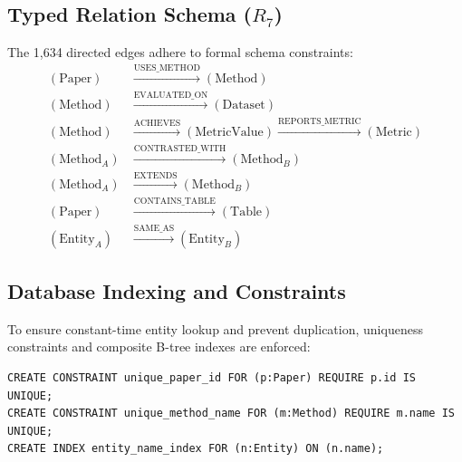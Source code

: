 \documentclass[12pt,a4paper,oneside]{report}
\begin{document}
\subsection{Typed Relation Schema ($R_7$)}
The 1,634 directed edges adhere to formal schema constraints:
\begin{equation}
\begin{aligned}
    (\text{Paper}) &\xrightarrow{\text{USES\_METHOD}} (\text{Method}) \\
    (\text{Method}) &\xrightarrow{\text{EVALUATED\_ON}} (\text{Dataset}) \\
    (\text{Method}) &\xrightarrow{\text{ACHIEVES}} (\text{MetricValue}) \xrightarrow{\text{REPORTS\_METRIC}} (\text{Metric}) \\
    (\text{Method}_A) &\xrightarrow{\text{CONTRASTED\_WITH}} (\text{Method}_B) \\
    (\text{Method}_A) &\xrightarrow{\text{EXTENDS}} (\text{Method}_B) \\
    (\text{Paper}) &\xrightarrow{\text{CONTAINS\_TABLE}} (\text{Table}) \\
    (\text{Entity}_A) &\xrightarrow{\text{SAME\_AS}} (\text{Entity}_B)
\end{aligned}
\end{equation}

\subsection{Database Indexing and Constraints}
To ensure constant-time entity lookup and prevent duplication, uniqueness constraints and composite B-tree indexes are enforced:
\begin{verbatim}
CREATE CONSTRAINT unique_paper_id FOR (p:Paper) REQUIRE p.id IS UNIQUE;
CREATE CONSTRAINT unique_method_name FOR (m:Method) REQUIRE m.name IS UNIQUE;
CREATE INDEX entity_name_index FOR (n:Entity) ON (n.name);
\end{verbatim}
\end{document}
